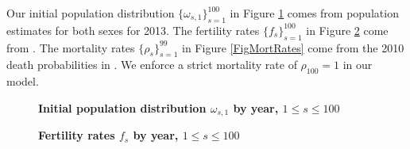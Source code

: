 \documentclass[letterpaper,12pt]{article}
\theoremstyle{definition}
\begin{document}
  Our initial population distribution $\{\omega_{s,1}\}_{s=1}^{100}$ in Figure \ref{FigInitPopDist} comes from \citet{Census:2014} population estimates for both sexes for 2013. The fertility rates $\{f_s\}_{s=1}^{100}$ in Figure \ref{FigFertRates} come from \citet[Table 1]{NVSR:2010}. The mortality rates $\{\rho_s\}_{s=1}^{99}$ in Figure \ref{FigMortRates} come from the 2010 death probabilities in \citet{SocSec:2010}. We enforce a strict mortality rate of $\rho_{100}=1$ in our model.

  \begin{figure}[htbp]\centering \captionsetup{width=4.0in}
    \caption{\label{FigInitPopDist}\textbf{Initial population distribution $\omega_{s,1}$ by year, $1\leq s\leq 100$}}
  \end{figure}

  \begin{figure}[htbp]\centering \captionsetup{width=4.0in}
    \caption{\label{FigFertRates}\textbf{Fertility rates $f_s$ by year, $1\leq s\leq 100$}}
  \end{figure}
\end{document}
